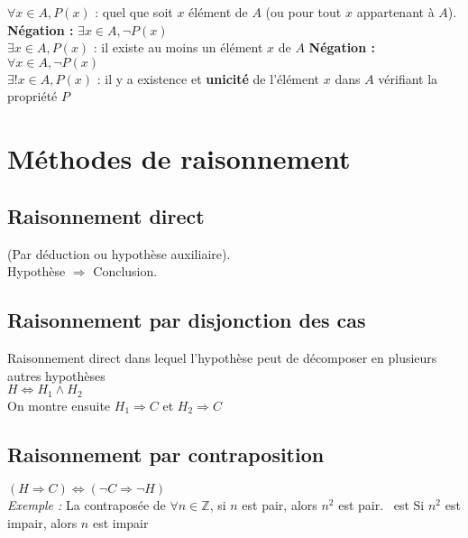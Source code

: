     $\forall x \in A, P(x)$ : quel que soit $x$ élément de $A$ (ou pour tout $x$ appartenant à $A$). \hfill \textbf{Négation :} $\exists x \in A, \neg P(x)$\\
    $\exists x \in A, P(x)$ : il existe au moins un élément $x$ de $A$ \hfill \textbf{Négation :} $\forall x \in A, \neg P(x)$\\
    $\exists !x \in A, P(x)$ : il y a existence et \textbf{unicité} de l'élément $x$ dans $A$ vérifiant la propriété $P$


\section{Méthodes de raisonnement}\label{sec:methodes-de-raisonnement}
  
  \begin{multicols}{2}
    \raggedcolumns
    
    \subsection{Raisonnement direct}\label{subsec:raisonnement-direct}
      
      (Par déduction ou hypothèse auxiliaire).\\
      Hypothèse $\Rightarrow$ Conclusion.
    
    \subsection{Raisonnement par disjonction des cas}\label{subsec:raisonnement-par-disjonction-des-cas}
      
      Raisonnement direct dans lequel l'hypothèse peut de décomposer en plusieurs autres hypothèses\\
      $H \Leftrightarrow H_1 \land H_2$\\
      On montre ensuite $H_1 \Rightarrow C$ et $H_2 \Rightarrow C$
    
    \subsection{Raisonnement par contraposition}\label{subsec:raisonnement-par-contraposition}
      
      $(H \Rightarrow C) \Leftrightarrow (\neg C \Rightarrow \neg H)$\\
      \textit{Exemple :} La contraposée de \og $\forall n \in \mathbb{Z}$, si $n$ est pair, alors $n^2$ est pair. \fg\ est \og Si $n^2$ est impair, alors $n$ est impair \fg
    

\end{multicols}
